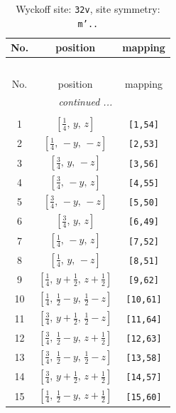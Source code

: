 \documentclass[fleqn,8pt]{jsarticle}
\begin{document}
\begin{longtable}{ccc}
\caption{Wyckoff site: {\tt 32v}, site symmetry: {\tt m'..}}
 \\
 \hline \hline
No. & position & mapping \\ \hline \endfirsthead

\multicolumn{2}{l}{\tablename\ \thetable{}} \\
 \hline \hline
No. & position & mapping \\ \hline \endhead

 \hline \hline
\multicolumn{2}{r}{\footnotesize\it continued ...} \\ \endfoot

 \hline \hline
\multicolumn{2}{r}{} \\ \endlastfoot

1 & $\left[ \frac{1}{4},\, y,\, z \right]$ & {\tt [1,54]} \\ \hline
2 & $\left[ \frac{1}{4},\, - y,\, - z \right]$ & {\tt [2,53]} \\ \hline
3 & $\left[ \frac{3}{4},\, y,\, - z \right]$ & {\tt [3,56]} \\ \hline
4 & $\left[ \frac{3}{4},\, - y,\, z \right]$ & {\tt [4,55]} \\ \hline
5 & $\left[ \frac{3}{4},\, - y,\, - z \right]$ & {\tt [5,50]} \\ \hline
6 & $\left[ \frac{3}{4},\, y,\, z \right]$ & {\tt [6,49]} \\ \hline
7 & $\left[ \frac{1}{4},\, - y,\, z \right]$ & {\tt [7,52]} \\ \hline
8 & $\left[ \frac{1}{4},\, y,\, - z \right]$ & {\tt [8,51]} \\ \hline
9 & $\left[ \frac{1}{4},\, y + \frac{1}{2},\, z + \frac{1}{2} \right]$ & {\tt [9,62]} \\ \hline
10 & $\left[ \frac{1}{4},\, \frac{1}{2} - y,\, \frac{1}{2} - z \right]$ & {\tt [10,61]} \\ \hline
11 & $\left[ \frac{3}{4},\, y + \frac{1}{2},\, \frac{1}{2} - z \right]$ & {\tt [11,64]} \\ \hline
12 & $\left[ \frac{3}{4},\, \frac{1}{2} - y,\, z + \frac{1}{2} \right]$ & {\tt [12,63]} \\ \hline
13 & $\left[ \frac{3}{4},\, \frac{1}{2} - y,\, \frac{1}{2} - z \right]$ & {\tt [13,58]} \\ \hline
14 & $\left[ \frac{3}{4},\, y + \frac{1}{2},\, z + \frac{1}{2} \right]$ & {\tt [14,57]} \\ \hline
15 & $\left[ \frac{1}{4},\, \frac{1}{2} - y,\, z + \frac{1}{2} \right]$ & {\tt [15,60]} \\ \hline

\end{longtable}
\end{document}
